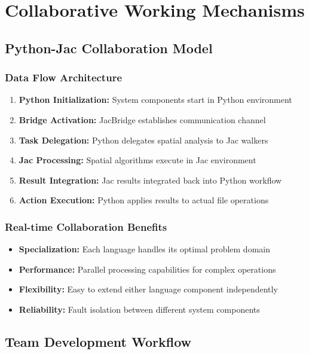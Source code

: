 \documentclass[12pt,a4paper]{article}
\begin{document}
\section{Collaborative Working Mechanisms}

\subsection{Python-Jac Collaboration Model}

\subsubsection{Data Flow Architecture}
\begin{enumerate}
    \item \textbf{Python Initialization:} System components start in Python environment
    \item \textbf{Bridge Activation:} JacBridge establishes communication channel
    \item \textbf{Task Delegation:} Python delegates spatial analysis to Jac walkers
    \item \textbf{Jac Processing:} Spatial algorithms execute in Jac environment
    \item \textbf{Result Integration:} Jac results integrated back into Python workflow
    \item \textbf{Action Execution:} Python applies results to actual file operations
\end{enumerate}

\subsubsection{Real-time Collaboration Benefits}
\begin{itemize}
    \item \textbf{Specialization:} Each language handles its optimal problem domain
    \item \textbf{Performance:} Parallel processing capabilities for complex operations
    \item \textbf{Flexibility:} Easy to extend either language component independently
    \item \textbf{Reliability:} Fault isolation between different system components
\end{itemize}

\subsection{Team Development Workflow}
\end{document}
